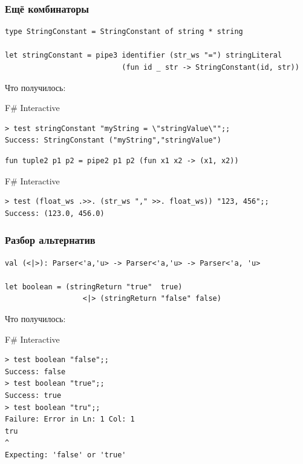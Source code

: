 \documentclass[xetex,mathserif,serif]{beamer}
\begin{document}
	\begin{frame}[fragile]
		\frametitle{Ещё комбинаторы}
		\begin{verbatim}
type StringConstant = StringConstant of string * string

let stringConstant = pipe3 identifier (str_ws "=") stringLiteral
                           (fun id _ str -> StringConstant(id, str))
		\end{verbatim}
		Что получилось:
		\begin{alertblock}{F\# Interactive}
			\begin{verbatim}
> test stringConstant "myString = \"stringValue\"";;
Success: StringConstant ("myString","stringValue")
			\end{verbatim}
		\end{alertblock}

		\begin{verbatim}
fun tuple2 p1 p2 = pipe2 p1 p2 (fun x1 x2 -> (x1, x2))
		\end{verbatim}

		\begin{alertblock}{F\# Interactive}
			\begin{verbatim}
> test (float_ws .>>. (str_ws "," >>. float_ws)) "123, 456";;
Success: (123.0, 456.0)
			\end{verbatim}
		\end{alertblock}
	\end{frame}

	\begin{frame}[fragile]
		\frametitle{Разбор альтернатив}
		\begin{small}
			\begin{verbatim}
val (<|>): Parser<'a,'u> -> Parser<'a,'u> -> Parser<'a, 'u>

let boolean = (stringReturn "true"  true)
                  <|> (stringReturn "false" false)
			\end{verbatim}
			Что получилось:
			\begin{alertblock}{F\# Interactive}
				\begin{verbatim}
> test boolean "false";;
Success: false
> test boolean "true";;
Success: true
> test boolean "tru";;
Failure: Error in Ln: 1 Col: 1
tru
^
Expecting: 'false' or 'true'
				\end{verbatim}
			\end{alertblock}
		\end{small}
	\end{frame}
\end{document}
